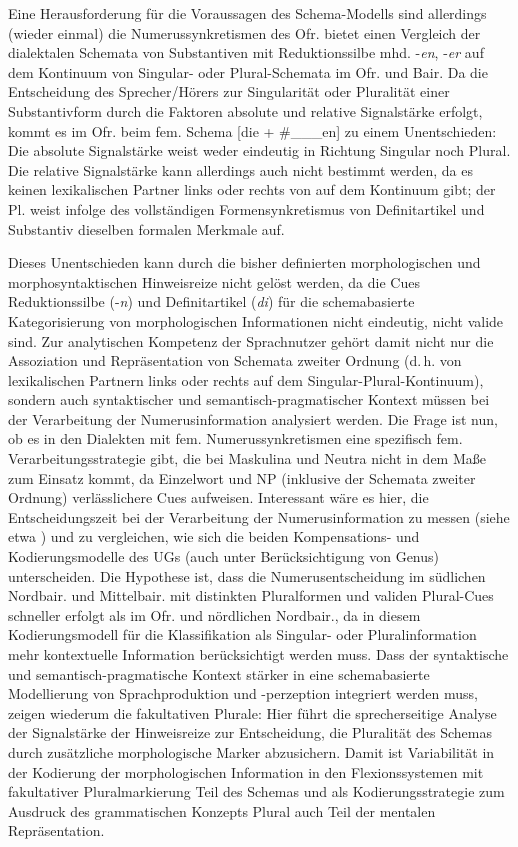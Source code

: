\begin{sloppypar}
Eine Herausforderung für die Voraussagen des Schema-Modells sind allerdings (wieder einmal) die Numerussynkretismen des Ofr.  bietet einen Vergleich der dialektalen Schemata von Substantiven mit Reduktionssilbe mhd. -\textit{en}, -\textit{er} auf dem Kontinuum von Singular- oder Plural-Schemata im Ofr. und Bair. Da die Entscheidung des Sprecher/Hörers zur Singularität oder Pluralität einer Substantivform durch die Faktoren absolute und relative Signalstärke erfolgt, kommt es im Ofr. beim fem. Schema [die + \#\_\_\_en] zu einem Unentschieden: Die absolute Signalstärke weist weder eindeutig in Richtung Singular noch Plural. Die relative Signalstärke kann allerdings auch nicht bestimmt werden, da es keinen lexikalischen Partner links oder rechts von   auf dem Kontinuum gibt; der Pl.   weist infolge des vollständigen Formensynkretismus von Definitartikel und Substantiv dieselben formalen Merkmale auf.
\end{sloppypar}

Dieses Unentschieden kann durch die bisher definierten morphologischen und morphosyntaktischen Hinweisreize nicht gelöst werden, da die Cues Reduktionssilbe (-\textit{n}) und Definitartikel (\textit{di}) für die schemabasierte Kategorisierung von morphologischen Informationen nicht eindeutig, nicht valide sind. Zur analytischen Kompetenz der Sprachnutzer gehört damit nicht nur die Assoziation und Repräsentation von Schemata zweiter Ordnung (d.\,h. von lexikalischen Partnern links oder rechts auf dem Singular-Plural-Kontinuum), sondern auch syntaktischer und semantisch-pragmatischer Kontext müssen bei der Verarbeitung der Numerusinformation analysiert werden. Die Frage ist nun, ob es in den Dialekten mit fem. Numerussynkretismen eine spezifisch fem. Verarbeitungsstrategie gibt, die bei Maskulina und Neutra nicht in dem Maße zum Einsatz kommt, da Einzelwort und NP (inklusive der Schemata zweiter Ordnung) verlässlichere Cues aufweisen. Interessant wäre es hier, die Entscheidungszeit bei der Verarbeitung der Numerusinformation zu messen (siehe etwa \citealt{KöpckeEtAl2021}) und zu vergleichen, wie sich die beiden Kompensations- und Kodierungsmodelle des UGs (auch unter Berücksichtigung von Genus) unterscheiden. Die Hypothese ist, dass die Numerusentscheidung im südlichen Nordbair. und Mittelbair. mit distinkten Pluralformen und validen Plural-Cues schneller erfolgt als im Ofr. und nördlichen Nordbair., da in diesem Kodierungsmodell für die Klassifikation als Singular- oder Pluralinformation mehr kontextuelle Information berücksichtigt werden muss. Dass der syntaktische und semantisch-pragmatische Kontext stärker in eine schemabasierte Modellierung von Sprachproduktion und -perzeption integriert werden muss, zeigen wiederum die fakultativen Plurale: Hier führt die sprecherseitige Analyse der Signalstärke der Hinweisreize zur Entscheidung, die Pluralität des Schemas durch zusätzliche morphologische Marker abzusichern. Damit ist Variabilität in der Kodierung der morphologischen Information in den Flexionssystemen mit fakultativer Pluralmarkierung Teil des Schemas und als Kodierungsstrategie zum Ausdruck des grammatischen Konzepts Plural auch Teil der mentalen Repräsentation.
